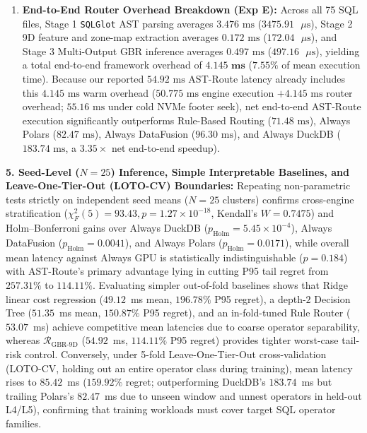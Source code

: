 \documentclass[10pt,a4paper]{article}
\begin{document}
\begin{enumerate}[leftmargin=1.5em,itemsep=2pt]
    \item \textbf{End-to-End Router Overhead Breakdown (Exp E):} Across all 75 SQL files, Stage 1 \texttt{SQLGlot} AST parsing averages $3.476\text{ ms}$ ($3475.91\text{ }\mu\text{s}$), Stage 2 9D feature and zone-map extraction averages $0.172\text{ ms}$ ($172.04\text{ }\mu\text{s}$), and Stage 3 Multi-Output GBR inference averages $0.497\text{ ms}$ ($497.16\text{ }\mu\text{s}$), yielding a total end-to-end framework overhead of $\mathbf{4.145\text{ ms}}$ ($7.55\%$ of mean execution time). Because our reported $54.92\text{ ms}$ AST-Route latency already includes this $4.145\text{ ms}$ warm overhead ($50.775\text{ ms}$ engine execution $+ 4.145\text{ ms}$ router overhead; $55.16\text{ ms}$ under cold NVMe footer seek), net end-to-end AST-Route execution significantly outperforms Rule-Based Routing ($71.48\text{ ms}$), Always Polars ($82.47\text{ ms}$), Always DataFusion ($96.30\text{ ms}$), and Always DuckDB ($183.74\text{ ms}$, a $3.35\times$ net end-to-end speedup).
\end{enumerate}



\textbf{5. Seed-Level ($N=25$) Inference, Simple Interpretable Baselines, and Leave-One-Tier-Out (LOTO-CV) Boundaries:} Repeating non-parametric tests strictly on independent seed means ($N=25$ clusters) confirms cross-engine stratification ($\chi^2_F(5)=93.43, p=1.27\times 10^{-18}$, Kendall's $W=0.7475$) and Holm--Bonferroni gains over Always DuckDB ($p_{\mathrm{Holm}}=5.45\times 10^{-4}$), Always DataFusion ($p_{\mathrm{Holm}}=0.0041$), and Always Polars ($p_{\mathrm{Holm}}=0.0171$), while overall mean latency against Always GPU is statistically indistinguishable ($p=0.184$) with AST-Route's primary advantage lying in cutting P95 tail regret from $257.31\%$ to $114.11\%$. Evaluating simpler out-of-fold baselines shows that Ridge linear cost regression ($49.12$~ms mean, $196.78\%$ P95 regret), a depth-$2$ Decision Tree ($51.35$~ms mean, $150.87\%$ P95 regret), and an in-fold-tuned Rule Router ($53.07$~ms) achieve competitive mean latencies due to coarse operator separability, whereas $\mathcal{R}_{\mathrm{GBR\mbox{-}9D}}$ ($54.92$~ms, $114.11\%$ P95 regret) provides tighter worst-case tail-risk control. Conversely, under 5-fold Leave-One-Tier-Out cross-validation (LOTO-CV, holding out an entire operator class during training), mean latency rises to $85.42$~ms ($159.92\%$ regret; outperforming DuckDB's $183.74$~ms but trailing Polars's $82.47$~ms due to unseen window and unnest operators in held-out L4/L5), confirming that training workloads must cover target SQL operator families.
\end{document}
